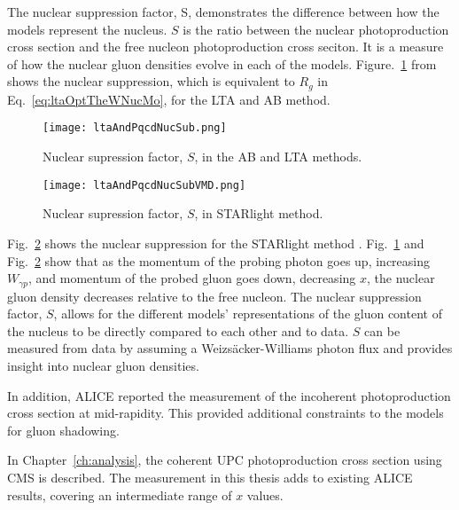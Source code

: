   The nuclear suppression factor, S, demonstrates the difference between how 
    the models represent the nucleus. 
  $S$ is the ratio between the nuclear photoproduction cross section and the     
    free nucleon photoproduction cross seciton.
  It is a measure of how the nuclear gluon densities evolve in each of the 
    models. 
  Figure.~\ref{fig:ltaAndPqcdNucSub} from \cite{lta2013.05} shows the nuclear 
    suppression, which is equivalent to $R_g$ in Eq.~\ref{eq:ltaOptTheWNucMo}, 
    for the LTA and AB method.
  \begin{figure}[h] 
    \begin{center}
      \texttt{[image: ltaAndPqcdNucSub.png]}
    \end{center}
    \caption{ \label{fig:ltaAndPqcdNucSub} Nuclear supression factor, $S$, in the AB and LTA methods.}
  \end{figure}
  \begin{figure}
    \begin{center}
      \texttt{[image: ltaAndPqcdNucSubVMD.png]}
    \end{center}
    \caption{ \label{fig:ltaAndPqcdNucSubSTARlight} Nuclear supression factor, $S$, in STARlight method.}
  \end{figure}
  Fig.~\ref{fig:ltaAndPqcdNucSubSTARlight} shows the nuclear suppression for the STARlight 
    method \cite{lta2013.05}. 
  Fig.~\ref{fig:ltaAndPqcdNucSub} and Fig.~\ref{fig:ltaAndPqcdNucSubSTARlight} 
    show that as the momentum of the probing photon goes up, increasing 
    $W_{\gamma p}$, and momentum of the probed gluon goes down, decreasing $x$, 
    the nuclear gluon density decreases relative to the free nucleon. 
  The nuclear suppression factor, $S$, allows for the different models' 
    representations of the gluon content of the nucleus to be directly compared
    to each other and to data. 
  $S$ can be measured from data by assuming a Weizs\"{a}cker-Williams photon flux and 
    provides insight into nuclear gluon densities.

    In addition, ALICE reported the measurement of the incoherent \JPsi{} 
      photoproduction cross section at mid-rapidity.
    This provided additional constraints to the models for gluon shadowing. 

    In Chapter~\ref{ch:analysis}, the coherent UPC \JPsi{} photoproduction 
      cross section using CMS is described.
    The measurement in this thesis adds to existing ALICE results, covering
      an intermediate range of $x$ values. 
